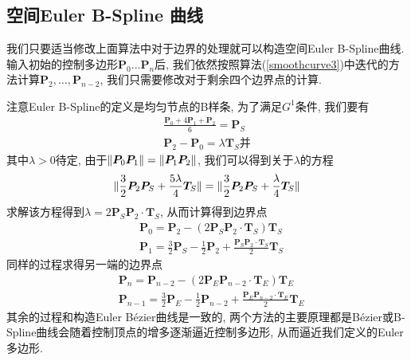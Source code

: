 \documentclass[utf8]{ctexart} %
\numberwithin{figure}{section}
\numberwithin{equation}{section}
\begin{document}
	 \subsection{空间Euler B-Spline 曲线}
		我们只要适当修改上面算法中对于边界的处理就可以构造空间Euler B-Spline曲线. 输入初始的控制多边形$\boldsymbol{P}_0\dots\boldsymbol{P}_n$后, 我们依然按照算法(\ref{smoothcurve3})中迭代的方法计算$\boldsymbol{P}_2,\dots,\boldsymbol{P}_{n-2}$, 我们只需要修改对于剩余四个边界点的计算.\par 
		注意Euler B-Spline的定义是均匀节点的B样条, 为了满足$G^1$条件, 我们要有\begin{equation}
		\begin{aligned}
		\frac{\boldsymbol{P}_0+4\boldsymbol{P}_1+\boldsymbol{P}_2}6 = \boldsymbol{P}_S\\
		\boldsymbol{P}_2-\boldsymbol{P}_0 = \lambda\boldsymbol{T}_S并
		\end{aligned}
		\end{equation}
		其中$\lambda>0$待定, 由于$\Arrowvert\boldsymbol{P}_0\boldsymbol{P}_1\Arrowvert=\Arrowvert\boldsymbol{P}_1\boldsymbol{P}_2\Arrowvert$, 我们可以得到关于$\lambda$的方程
		\begin{equation}
		\Arrowvert\frac32\boldsymbol{P}_2\boldsymbol{P}_S+\frac{5\lambda}4\boldsymbol{T}_S\Arrowvert=\Arrowvert\frac32\boldsymbol{P}_2\boldsymbol{P}_S+\frac{\lambda}4\boldsymbol{T}_S\Arrowvert
		\end{equation}
		求解该方程得到$\lambda = 2\boldsymbol{P}_S\boldsymbol{P}_2\cdot\boldsymbol{T}_S$, 从而计算得到边界点
		\begin{equation}
		\begin{aligned}
		&\boldsymbol{P}_0 = \boldsymbol{P}_2-(2\boldsymbol{P}_S\boldsymbol{P}_2\cdot\boldsymbol{T}_S)\boldsymbol{T}_S\\
		&\boldsymbol{P}_1 = \frac32\boldsymbol{P}_S-\frac12\boldsymbol{P}_2+\frac{\boldsymbol{P}_S\boldsymbol{P}_2\cdot\boldsymbol{T}_S}2\boldsymbol{T}_S
		\end{aligned}
		\end{equation}
		同样的过程求得另一端的边界点
		\begin{equation}
		\begin{aligned}
		&\boldsymbol{P}_n = \boldsymbol{P}_{n-2}-(2\boldsymbol{P}_E\boldsymbol{P}_{n-2}\cdot\boldsymbol{T}_E)\boldsymbol{T}_E\\
		&\boldsymbol{P}_{n-1} = \frac32\boldsymbol{P}_E-\frac12\boldsymbol{P}_{n-2}+\frac{\boldsymbol{P}_E\boldsymbol{P}_{n-2}\cdot\boldsymbol{T}_E}2\boldsymbol{T}_E
		\end{aligned}
		\end{equation}
		其余的过程和构造Euler B\'ezier曲线是一致的, 两个方法的主要原理都是B\'ezier或B-Spline曲线会随着控制顶点的增多逐渐逼近控制多边形, 从而逼近我们定义的Euler多边形. 
\end{document}
